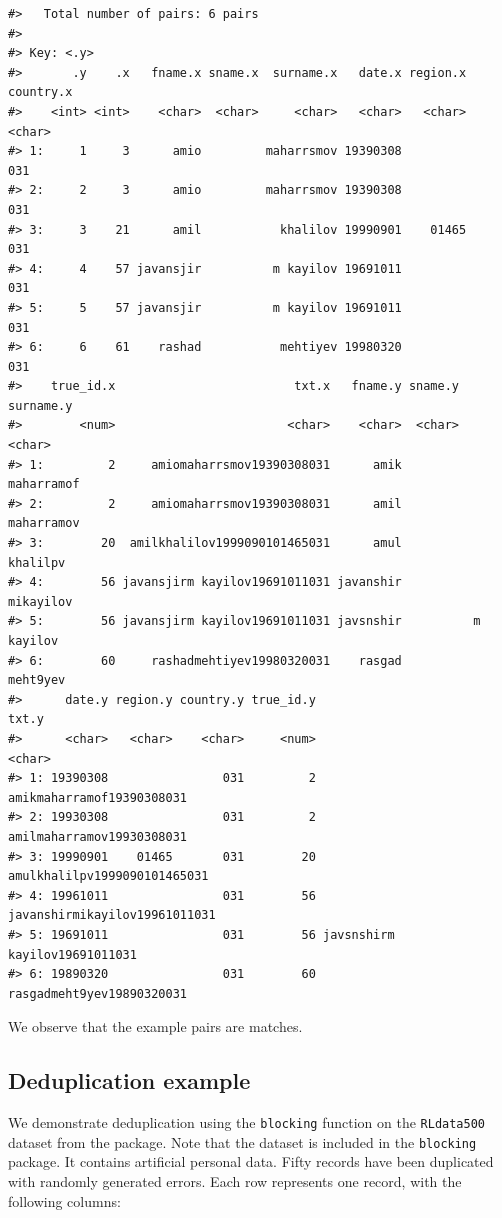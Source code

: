 \begin{verbatim}
#>   Total number of pairs: 6 pairs
#> 
#> Key: <.y>
#>       .y    .x   fname.x sname.x  surname.x   date.x region.x country.x
#>    <int> <int>    <char>  <char>     <char>   <char>   <char>    <char>
#> 1:     1     3      amio         maharrsmov 19390308                031
#> 2:     2     3      amio         maharrsmov 19390308                031
#> 3:     3    21      amil           khalilov 19990901    01465       031
#> 4:     4    57 javansjir          m kayilov 19691011                031
#> 5:     5    57 javansjir          m kayilov 19691011                031
#> 6:     6    61    rashad           mehtiyev 19980320                031
#>    true_id.x                         txt.x   fname.y sname.y  surname.y
#>        <num>                        <char>    <char>  <char>     <char>
#> 1:         2     amiomaharrsmov19390308031      amik         maharramof
#> 2:         2     amiomaharrsmov19390308031      amil         maharramov
#> 3:        20  amilkhalilov1999090101465031      amul           khalilpv
#> 4:        56 javansjirm kayilov19691011031 javanshir          mikayilov
#> 5:        56 javansjirm kayilov19691011031 javsnshir          m kayilov
#> 6:        60     rashadmehtiyev19980320031    rasgad           meht9yev
#>      date.y region.y country.y true_id.y                         txt.y
#>      <char>   <char>    <char>     <num>                        <char>
#> 1: 19390308                031         2     amikmaharramof19390308031
#> 2: 19930308                031         2     amilmaharramov19930308031
#> 3: 19990901    01465       031        20  amulkhalilpv1999090101465031
#> 4: 19961011                031        56 javanshirmikayilov19961011031
#> 5: 19691011                031        56 javsnshirm kayilov19691011031
#> 6: 19890320                031        60     rasgadmeht9yev19890320031
\end{verbatim}

We observe that the example pairs are matches.

\subsection{Deduplication example}\label{deduplication-example}

We demonstrate deduplication using the \texttt{blocking} function on the \texttt{RLdata500} dataset from the  package. Note that the dataset is included in the \texttt{blocking} package. It contains artificial personal data. Fifty records have been duplicated with randomly generated errors. Each row represents one record, with the following columns:

